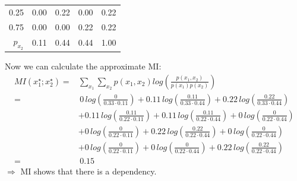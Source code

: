 {\begin{enumerate}[a)]
\begin{table}[H]
\begin{tabular}{r|rrr|r}
  		0.25 & 0.00 & 0.22 & 0.00 & 0.22 \\ 
  		0.75 & 0.00 & 0.00 & 0.22 & 0.22 \\
  		\hline 
  		$p_{x_2}$& 0.11 & 0.44 & 0.44 & 1.00 \\ 
  		\hline
  	\end{tabular}
  \end{table}
Now we can calculate the approximate MI: 
   \begin{align*}
   	MI(x_1^\star ; x_2^\star) = & \sum_{x_1} \sum_{x_2} p(x_1, x_2) log\left(\frac{p(x_1, x_2)}{p(x_1) p(x_2)} \right)\\
 	=& \,0\, log\left(\frac{0}{0.33 \cdot 0.11} \right) 
   	+ 0.11\, log\left(\frac{0.11}{0.33 \cdot 0.44} \right) 
   	+ 0.22\, log\left(\frac{0.22}{0.33 \cdot 0.44} \right) \\
   	&+ 0.11\, log\left(\frac{0.11}{0.22 \cdot 0.11} \right)
   	+ 0.11\, log\left(\frac{0.11}{0.22 \cdot 0.44} \right) 
   	+ 0\, log\left(\frac{0}{0.22 \cdot 0.44} \right) \\
   	&+ 0\, log\left(\frac{0}{0.22 \cdot 0.11} \right)
   	+ 0.22\, log\left(\frac{0.22}{0.22 \cdot 0.44} \right) 
   	+ 0\, log\left(\frac{0}{0.22 \cdot 0.44} \right) \\
   	&+ 0\, log\left(\frac{0}{0.22 \cdot 0.11} \right)
   	+ 0\, log\left(\frac{0}{0.22 \cdot 0.44} \right) 
   	+ 0.22\, log\left(\frac{0.22}{0.22 \cdot 0.44} \right) \\
   	= & \, 0.15
   \end{align*}
$\Rightarrow$ MI shows that there is a dependency.
  
 
  
\end{enumerate}
}
